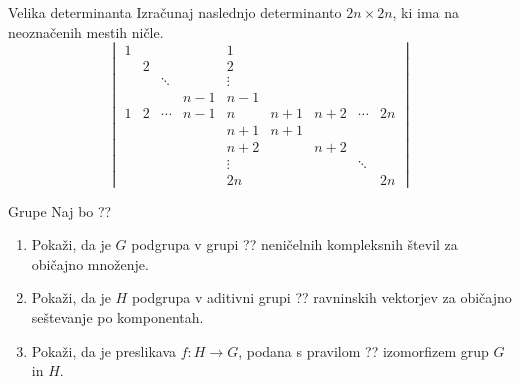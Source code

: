 \begin{frame}{Velika determinanta}
	Izračunaj naslednjo determinanto $2n \times 2n$, ki ima na neoznačenih mestih ničle.
	\[\begin{vmatrix}
		1 &   &                       &     & 1                     &     &     &                       &    \\
  		& 2 &                       &     & 2                     &     &     &                       &    \\
  		&   & \ddots &     & \vdots &     &     &                       &    \\
  		&   &                       & n-1 & n-1                   &     &     &                       &    \\
		1 & 2 & \cdots & n-1 & n                     & n+1 & n+2 & \cdots & 2n \\
  		&   &                       &     & n+1                   & n+1 &     &                       &    \\
  		&   &                       &     & n+2                   &     & n+2 &                       &    \\
  		&   &                       &     & \vdots &     &     & \ddots &    \\
  		&   &                       &     & 2n                    &     &     &                       & 2n
	\end{vmatrix}
	\]
\end{frame}

\begin{frame}{Grupe}
	Naj bo
	??
	\begin{enumerate}
		\item
			Pokaži, da je $G$ podgrupa v grupi ??
			neničelnih kompleksnih števil za običajno množenje.
		\item
			Pokaži, da je $H$ podgrupa v aditivni grupi ??
			ravninskih vektorjev za običajno seštevanje po komponentah.
		\item
			Pokaži, da je preslikava $f:H\to G$, podana s pravilom
			??
			izomorfizem grup $G$ in $H$.
	\end{enumerate}
\end{frame}
